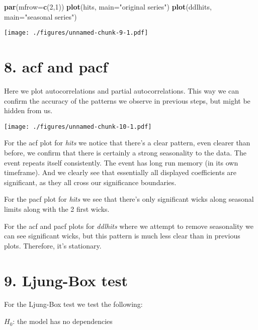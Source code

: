 \documentclass[]{article}
\newenvironment{Shaded}{\begin{snugshade}}{\end{snugshade}}
\newcommand{\DataTypeTok}[1]{\textcolor[rgb]{0.13,0.29,0.53}{#1}}
\newcommand{\DecValTok}[1]{\textcolor[rgb]{0.00,0.00,0.81}{#1}}
\newcommand{\KeywordTok}[1]{\textcolor[rgb]{0.13,0.29,0.53}{\textbf{#1}}}
\newcommand{\NormalTok}[1]{#1}
\newcommand{\StringTok}[1]{\textcolor[rgb]{0.31,0.60,0.02}{#1}}
\begin{document}
\begin{Shaded}
\begin{Highlighting}[]
\KeywordTok{par}\NormalTok{(}\DataTypeTok{mfrow=}\KeywordTok{c}\NormalTok{(}\DecValTok{2}\NormalTok{,}\DecValTok{1}\NormalTok{))}
\KeywordTok{plot}\NormalTok{(hits, }\DataTypeTok{main=}\StringTok{"original series"}\NormalTok{)}
\KeywordTok{plot}\NormalTok{(ddlhits, }\DataTypeTok{main=}\StringTok{"seasonal series"}\NormalTok{)}
\end{Highlighting}
\end{Shaded}

\texttt{[image: ./figures/unnamed-chunk-9-1.pdf]}

\newpage

\hypertarget{acf-and-pacf}{%
\section{8. acf and pacf}\label{acf-and-pacf}}

Here we plot autocorrelations and partial autocorrelations. This way we
can confirm the accuracy of the patterns we observe in previous steps,
but might be hidden from us.

\texttt{[image: ./figures/unnamed-chunk-10-1.pdf]}

For the acf plot for \emph{hits} we notice that there's a clear pattern,
even clearer than before, we confirm that there is certainly a strong
seasonality to the data. The event repeats itself consistently. The
event has long run memory (in its own timeframe). And we clearly see
that essentially all displayed coefficients are significant, as they all
cross our significance boundaries.

For the pacf plot for \emph{hits} we see that there's only significant
wicks along seasonal limits along with the 2 first wicks.

For the acf and pacf plots for \emph{ddlhits} where we attempt to remove
seasonality we can see significant wicks, but this pattern is much less
clear than in previous plots. Therefore, it's stationary.

\hypertarget{ljung-box-test}{%
\section{9. Ljung-Box test}\label{ljung-box-test}}

For the Ljung-Box test we test the following:

\(H_0\): the model has no dependencies
\end{document}
